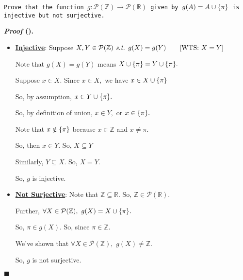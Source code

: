 \documentclass[12pt,a4paper]{article}
\newcounter{nprf}[subsection]
\newenvironment*{prf}{\par\indent\textbf{\textit{Proof} (\stepcounter{nprf}\thenprf). }\par }{\par\hfill $\blacksquare$\par}
\def\Z{{\mathbb{Z}}}
\def\R{{\mathbb{R}}}
\def\pow{{\mathcal{P}}}
\def\st{\emph{ s.t. }}
\begin{document}
\begin{framed}
\noindent\texttt{Prove that the function $g:\pow(\Z)\to\pow(\R)$ given by $g(A)=A\cup\qty{\pi}$ is injective but not surjective.}
\begin{prf}
	\begin{itemize}
		\item \textbf{\underline{Injective}}: Suppose $X,Y\in\pow(\Z)\st g(X)=g(Y)\qquad[\text{WTS: }X=Y]$\par Note that $g(X)=g(Y)$ means $X\cup\qty{\pi}=Y\cup\qty{\pi}.$\par Suppose $x\in X.$ Since $x\in X,$ we have $x\in X\cup\qty{\pi}$\par So, by assumption, $x\in Y\cup\qty{\pi}.$\par So, by definition of union, $x\in Y,$ or $x\in\qty{\pi}.$\par Note that $x\notin\qty{\pi}$ because $x\in\Z$ and $x\neq\pi.$\par So, then $x\in Y.$ So, $X\subseteq Y$\par Similarly, $Y\subseteq X.$ So, $X=Y.$\par So, $g$ is injective. 
		\item \textbf{\underline{Not Surjective}}: Note that $\Z\subseteq\R.$ So, $\Z\in\pow(\R).$\par Further, $\forall X\in\pow(\Z),\ g(X)=X\cup\qty{\pi}.$\par So, $\pi\in g(X).$ So, since $\pi\in\Z.$\par We've shown that $\forall X\in\pow(\Z),$ $g(X)\neq\Z.$\par So, $g$ is not surjective.
	\end{itemize}
\end{prf}
\end{framed}
\end{document}
